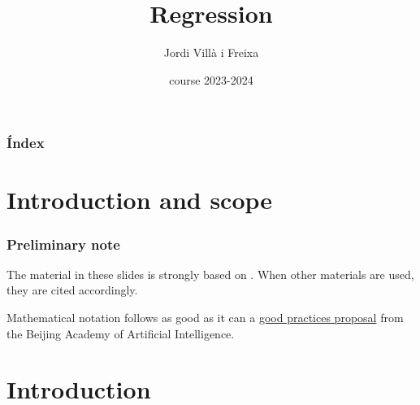 \documentclass{beamer}
\title[Regression]{Regression} %
\author{Jordi Villà i Freixa} %
\institute[FCTE] %
{
Universitat de Vic - Universitat Central de Catalunya \\
Study Abroad\\ %
\medskip
\textit{jordi.villa@uvic.cat} %
}
\date{course 2023-2024}
\begin{document}
\begin{frame}
\titlepage %
\end{frame}

\begin{frame}
\frametitle{Índex} %
\tableofcontents %
\end{frame}

\section{Introduction and scope}
\begin{frame}
  \frametitle{Preliminary note}
  The material in these slides is strongly based on \cite{kroese2020}. When other materials are used, they are cited accordingly.

  Mathematical notation follows as good as it can a \href{https://ctan.math.utah.edu/ctan/tex-archive/macros/latex/contrib/mlmath/mlmath.pdf}{good practices proposal} from the Beijing Academy of Artificial Intelligence.
  \end{frame}

\section{Introduction} %

\end{document}
